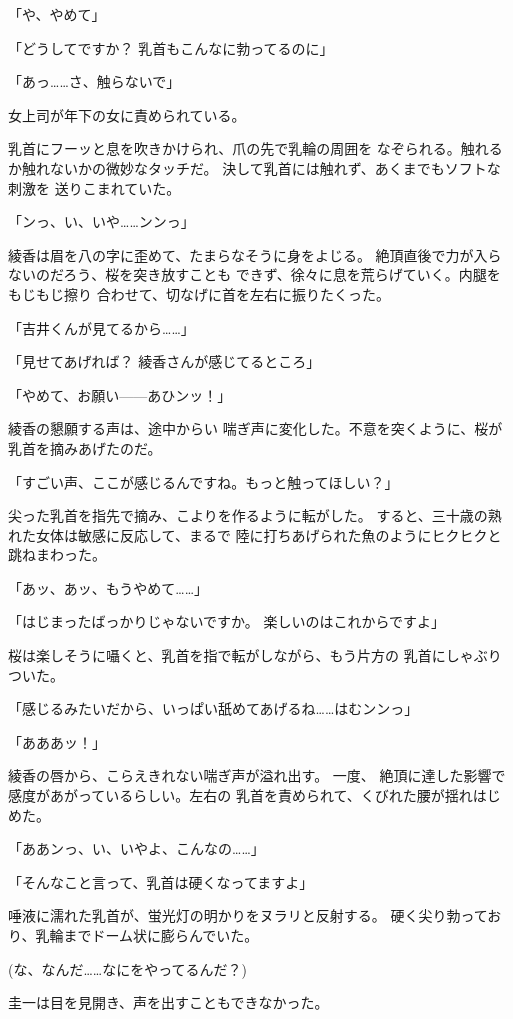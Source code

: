 ﻿\documentclass[
    book,tate,
    line_length=30zw,
    jafontsize=12pt,
    paper=b5j,
    landscape,
    ]{jlreq}
\begin{document}
「や、やめて」

「どうしてですか？ 乳首もこんなに勃ってるのに」

「あっ……さ、触らないで」

女上司が年下の女に責められている。

乳首にフーッと息を吹きかけられ、爪の先で乳輪の周囲を
なぞられる。触れるか触れないかの微妙なタッチだ。
決して乳首には触れず、あくまでもソフトな刺激を
送りこまれていた。

「ンっ、い、いや……ンンっ」

綾香は眉を八の字に歪めて、たまらなそうに身をよじる。
絶頂直後で力が入らないのだろう、桜を突き放すことも
できず、徐々に息を荒らげていく。内腿をもじもじ擦り
合わせて、切なげに首を左右に振りたくった。

「吉井くんが見てるから……」

「見せてあげれば？ 綾香さんが感じてるところ」

「やめて、お願い------あひンッ！」

綾香の懇願する声は、途中からい
喘ぎ声に変化した。不意を突くように、桜が乳首を摘みあげたのだ。

「すごい声、ここが感じるんですね。もっと触ってほしい？」

尖った乳首を指先で摘み、こよりを作るように転がした。
すると、三十歳の熟れた女体は敏感に反応して、まるで
陸に打ちあげられた魚のようにヒクヒクと跳ねまわった。

「あッ、あッ、もうやめて……」

「はじまったばっかりじゃないですか。 楽しいのはこれからですよ」

桜は楽しそうに囁くと、乳首を指で転がしながら、もう片方の
乳首にしゃぶりついた。

「感じるみたいだから、いっぱい舐めてあげるね……はむンンっ」

「あああッ！」

綾香の唇から、こらえきれない喘ぎ声が溢れ出す。 一度、
絶頂に達した影響で感度があがっているらしい。左右の
乳首を責められて、くびれた腰が揺れはじめた。

「ああンっ、い、いやよ、こんなの……」

「そんなこと言って、乳首は硬くなってますよ」

唾液に濡れた乳首が、蛍光灯の明かりをヌラリと反射する。
硬く尖り勃っており、乳輪までドーム状に膨らんでいた。

(な、なんだ……なにをやってるんだ？)

圭一は目を見開き、声を出すこともできなかった。
\end{document}

